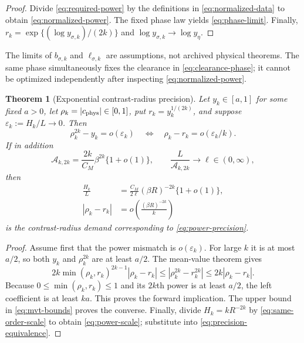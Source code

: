 \documentclass[11pt]{article}
\newtheorem{theorem}{Theorem}[section]
\theoremstyle{remark}
\newcommand{\cA}{\mathcal A}
\begin{document}
\begin{proof}
Divide \eqref{eq:required-power} by the definitions in
\eqref{eq:normalized-data} to obtain \eqref{eq:normalized-power}.  The fixed
phase law yields \eqref{eq:phase-limit}.  Finally,
$r_k=\exp\{(\log y_{\sigma,k})/(2k)\}$ and
$\log y_{\sigma,k}\to\log y_\eta$.
\end{proof}

The limits of $b_{\sigma,k}$ and $\ell_{\sigma,k}$ are assumptions, not
archived physical theorems.  The same phase simultaneously fixes the
clearance in \eqref{eq:clearance-phase}; it cannot be optimized independently
after inspecting \eqref{eq:normalized-power}.

\begin{theorem}[Exponential contrast-radius precision]
\label{thm:radius-precision}
Let $y_k\in[a,1]$ for some fixed $a>0$, let
$\rho_k=|c_{\rm phys}|\in[0,1]$, put $r_k=y_k^{1/(2k)}$, and suppose
$\varepsilon_k:=H_k/L\to0$.  Then
\begin{equation}
 \rho_k^{2k}-y_k=o(\varepsilon_k)
 \quad\Longleftrightarrow\quad
 \rho_k-r_k=o(\varepsilon_k/k).
 \label{eq:precision-equivalence}
\end{equation}
If in addition
\begin{equation}
 \cA_{k,2k}=\frac{2k}{C_M}\beta^{2k}\{1+o(1)\},
 \qquad
 \frac{L}{\cA_{k,2k}}\longrightarrow\ell\in(0,\infty),
 \label{eq:same-order-scale}
\end{equation}
then
\begin{align}
 \frac{H_k}{L}
 &=\frac{C_M}{2\ell}(\beta R)^{-2k}\{1+o(1)\},
 \label{eq:power-scale}\\
 |\rho_k-r_k|
 &=o\left(\frac{(\beta R)^{-2k}}{k}\right)
 \label{eq:radius-scale}
\end{align}
is the contrast-radius demand corresponding to \eqref{eq:power-precision}.
\end{theorem}

\begin{proof}
Assume first that the power mismatch is $o(\varepsilon_k)$.  For large $k$
it is at most $a/2$, so both $y_k$ and $\rho_k^{2k}$ are at least $a/2$.
The mean-value theorem gives
\begin{equation}
 2k\min(\rho_k,r_k)^{2k-1}|\rho_k-r_k|
 \le |\rho_k^{2k}-r_k^{2k}|
 \le 2k|\rho_k-r_k|.
 \label{eq:mvt-bounds}
\end{equation}
Because $0\le\min(\rho_k,r_k)\le1$ and its $2k$th power is at least $a/2$,
the left coefficient is at least $ka$.  This proves the forward implication.
The upper bound in \eqref{eq:mvt-bounds} proves the converse.  Finally,
divide $H_k=kR^{-2k}$ by \eqref{eq:same-order-scale} to obtain
\eqref{eq:power-scale}; substitute into \eqref{eq:precision-equivalence}.
\end{proof}
\end{document}
